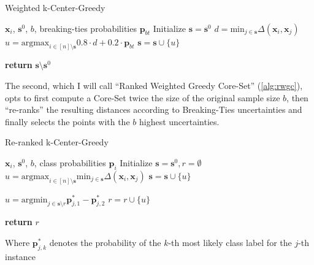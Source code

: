 \documentclass[english,bachelor,ul]{webisthesis} %
\begin{document}
\begin{algorithm}
\caption{Weighted k-Center-Greedy}%
\makeatletter{}\makeatother
\label{alg:wgc}
\begin{algorithmic}


\Require $ \mathbf{x}_i $, $ \mathbf{s}^0 $, $ b $, breaking-ties probabilities $ \mathbf{p}_{bt} $
\State Initialize $ \mathbf{s} = \mathbf{s}^0 $
\Repeat
\State $ d = \text{min}_{j \in \mathbf{s}} \Delta(\mathbf{x}_i, \mathbf{x}_j) $ 
    \State $ u = \text{argmax}_{i \in [n] \setminus \mathbf{s}} 0.8 \cdot d + 0.2 \cdot \mathbf{p}_{bt} $
\State $ \mathbf{s} = \mathbf{s} \cup \{u\} $

\State \textbf{return} $\mathbf{s} \setminus \mathbf{s}^0 $
\end{algorithmic}
\end{algorithm}

The second, which I will call ``Ranked Weighted Greedy Core-Set'' (\ref{alg:rwgc}), opts to first compute a Core-Set twice the size of the original sample size $b$, then ``re-ranks'' the resulting distances according to Breaking-Ties uncertainties and finally selects the points with the $b$ highest uncertainties.

\begin{algorithm}
\caption{Re-ranked k-Center-Greedy}%
\makeatletter{}\makeatother
\label{alg:rwgc}
\begin{algorithmic}


\Require $ \mathbf{x}_i $, $ \mathbf{s}^0 $, $ b $, class probabilities $ \mathbf{p}_i $
\State Initialize $ \mathbf{s} = \mathbf{s}^0, r = \emptyset $
\Repeat
\State $ u = \text{argmax}_{i \in [n] \setminus \mathbf{s}} \text{min}_{j \in \mathbf{s}} \Delta(\mathbf{x}_i, \mathbf{x}_j) $
\State $ \mathbf{s} = \mathbf{s} \cup \{u\} $



\Repeat
\State $ u = \text{argmin}_{j \in \mathbf{s} \setminus r}\mathbf{p}_{j, 1}^* - \mathbf{p}_{j, 2}^* $
\State $ r = r \cup \{u\} $

\State \textbf{return} $ r $
\end{algorithmic}
\end{algorithm}
\noindent Where $ \mathbf{p}_{j, k}^* $ denotes the probability of the $ k $-th most likely class label for the $ j $-th instance 
\end{document}
